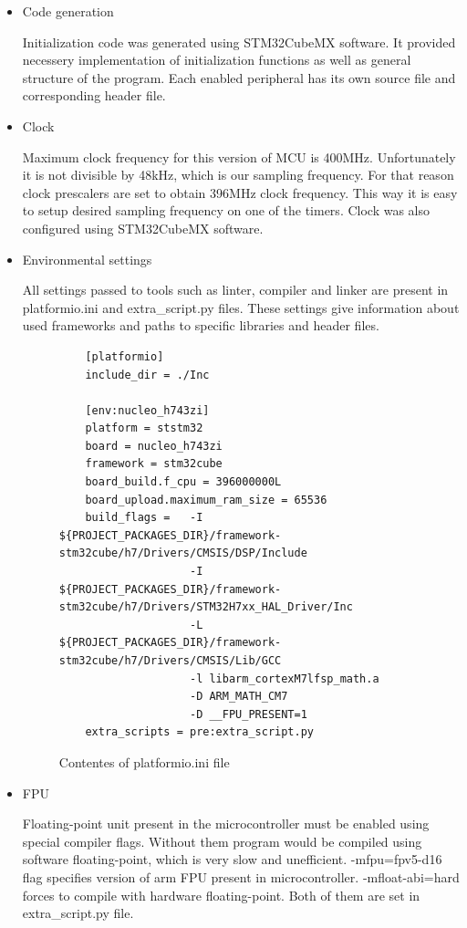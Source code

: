 \documentclass[a4paper,twoside,12pt]{book}
\begin{document}
\begin{itemize}
    \item Code generation

    Initialization code was generated using STM32CubeMX software.
    It provided necessery implementation of initialization functions
    as well as general structure of the program.
    Each enabled peripheral has its own source file
    and corresponding header file.

    \item Clock

    Maximum clock frequency for this version of MCU is 400MHz.
    Unfortunately it is not divisible by 48kHz, which is our sampling frequency.
    For that reason clock prescalers are set to obtain 396MHz clock frequency.
    This way it is easy to setup desired sampling frequency on one of the timers.
    Clock was also configured using STM32CubeMX software.

    \item Environmental settings
    
    All settings passed to tools such as linter, compiler and linker
    are present in platformio.ini and extra\_script.py files.
    These settings give information about used frameworks
    and paths to specific libraries and header files.

    \begin{figure}[H]
    \centering
    \begin{lstlisting}
    [platformio]
    include_dir = ./Inc

    [env:nucleo_h743zi]
    platform = ststm32
    board = nucleo_h743zi
    framework = stm32cube
    board_build.f_cpu = 396000000L
    board_upload.maximum_ram_size = 65536
    build_flags =   -I ${PROJECT_PACKAGES_DIR}/framework-stm32cube/h7/Drivers/CMSIS/DSP/Include
                    -I ${PROJECT_PACKAGES_DIR}/framework-stm32cube/h7/Drivers/STM32H7xx_HAL_Driver/Inc
                    -L ${PROJECT_PACKAGES_DIR}/framework-stm32cube/h7/Drivers/CMSIS/Lib/GCC
                    -l libarm_cortexM7lfsp_math.a
                    -D ARM_MATH_CM7
                    -D __FPU_PRESENT=1
    extra_scripts = pre:extra_script.py
    \end{lstlisting}
    \caption{Contentes of platformio.ini file}
    \label{fig:ini}
    \end{figure}

    \item FPU

    Floating-point unit present in the microcontroller must be enabled
    using special compiler flags. Without them program would be compiled
    using software floating-point, which is very slow and unefficient.
    -mfpu=fpv5-d16 flag specifies version of arm FPU present in microcontroller.
    -mfloat-abi=hard forces to compile with hardware floating-point.
    Both of them are set in extra\_script.py file.


\end{itemize}
\end{document}
